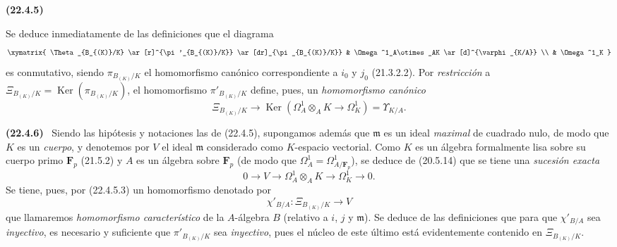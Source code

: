 \documentclass[10pt,oneside]{book}
\makeatletter
\newcommand{\setmanualcurrentlabel}[1]{\def\@currentlabel{#1}}
\newcommand{\oldpage}[2][]{%
  \setcounter{footnote}{0}%
  \marginpar{\scriptsize\textbf{#1}~|~#2}\ignorespaces}
\newenvironment{env}[1][]{\setmanualcurrentlabel{#1}\par\medskip\noindent\textbf{(#1)}\ }{\par}
\makeatother
\begin{document}
\begin{env}[22.4.5]
\oldpage[0\textsubscript{IV-1}]{198}

Se deduce inmediatamente de las definiciones que el diagrama
\[
  \xymatrix{
    \Theta_{B_{(K)}/K} \ar[r]^{\pi'_{B_{(K)}/K}} \ar[dr]_{\pi_{B_{(K)}/K}}
      & \Omega^1_A\otimes_AK \ar[d]^{\varphi_{K/A}} \\
    & \Omega^1_K
  }
\]
es conmutativo, siendo $\pi_{B_{(K)}/K}$ el homomorfismo canónico
correspondiente a $i_0$ y $j_0$ (21.3.2.2). Por \emph{restricción} a
$\Xi_{B_{(K)}/K}=\operatorname{Ker}(\pi_{B_{(K)}/K})$, el homomorfismo
$\pi'_{B_{(K)}/K}$ define, pues, un \emph{homomorfismo canónico}
\begin{equation}
\label{0.22.4.5.3-es}
  \Xi_{B_{(K)}/K}\longrightarrow
  \operatorname{Ker}(\Omega^1_A\otimes_AK\longrightarrow\Omega^1_K)=\Upsilon_{K/A}.
  \tag{22.4.5.3}
\end{equation}
\end{env}

\begin{env}[22.4.6]
\label{0.22.4.6-es}
Siendo las hipótesis y notaciones las de (22.4.5), supongamos además que
$\mathfrak m$ es un ideal \emph{maximal} de cuadrado nulo, de modo que $K$ es un
\emph{cuerpo}, y denotemos por $V$ el ideal $\mathfrak m$ considerado como
$K$-espacio vectorial. Como $K$ es un álgebra formalmente lisa sobre su cuerpo primo
$\mathbf F_p$ (21.5.2) y $A$ es un álgebra sobre $\mathbf F_p$ (de modo
que $\Omega^1_A=\Omega^1_{A/\mathbf F_p}$), se deduce de (20.5.14) que se tiene
una \emph{sucesión exacta}
\begin{equation}
\label{0.22.4.6.1-es}
  0\longrightarrow V\longrightarrow\Omega^1_A\otimes_AK
  \longrightarrow\Omega^1_K\longrightarrow0.
  \tag{22.4.6.1}
\end{equation}
Se tiene, pues, por (22.4.5.3) un homomorfismo denotado por
\begin{equation}
\label{0.22.4.6.2-es}
  \chi'_{B/A}:\Xi_{B_{(K)}/K}\longrightarrow V
  \tag{22.4.6.2}
\end{equation}
que llamaremos \emph{homomorfismo característico} de la $A$-álgebra
$B$ (relativo a $i$, $j$ y $\mathfrak m$). Se deduce de las definiciones que para
que $\chi'_{B/A}$ sea \emph{inyectivo}, es necesario y suficiente que
$\pi'_{B_{(K)}/K}$ sea \emph{inyectivo}, pues el núcleo de este último está evidentemente
contenido en $\Xi_{B_{(K)}/K}$.
\end{env}
\end{document}
